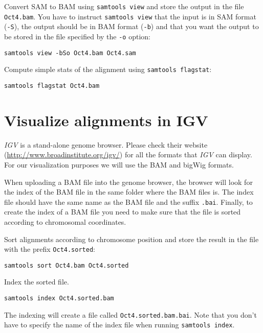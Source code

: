 \begin{steps}
Convert SAM to BAM using \texttt{samtools view} and store the output in the file
\texttt{Oct4.bam}. You have to instruct \texttt{samtools view} that the input is in SAM
format (\texttt{-S}), the output should be in BAM format (\texttt{-b}) and that
you want the output to be stored in the file specified by the \texttt{-o}
option:

\begin{lstlisting}
samtools view -bSo Oct4.bam Oct4.sam
\end{lstlisting}
\end{steps}

\begin{advanced}
Compute simple stats of the alignment using \texttt{samtools flagstat}:

\begin{lstlisting}
samtools flagstat Oct4.bam
\end{lstlisting}
\end{advanced}

\section{Visualize alignments in IGV}

\begin{information}
\emph{IGV} is a stand-alone genome browser. Please check their website
(\url{http://www.broadinstitute.org/igv/}) for all the formats that \emph{IGV}
can display. For our visualization purposes we will use the BAM and bigWig
formats.
\end{information}

\begin{note}
When uploading a BAM file into the genome browser, the browser will look for the
index of the BAM file in the same folder where the BAM files is. The index file
should have the same name as the BAM file and the suffix \texttt{.bai}. Finally, to
create the index of a BAM file you need to make sure that the file is sorted
according to chromosomal coordinates.
\end{note}

\begin{steps}
Sort alignments according to chromosome position and store the result in the
file with the prefix \texttt{Oct4.sorted}:

\begin{lstlisting}
samtools sort Oct4.bam Oct4.sorted
\end{lstlisting}

Index the sorted file.

\begin{lstlisting}
samtools index Oct4.sorted.bam
\end{lstlisting}

The indexing will create a file called \texttt{Oct4.sorted.bam.bai}. Note that
you don't have to specify the name of the index file when running \texttt{samtools index}.
\end{steps}

